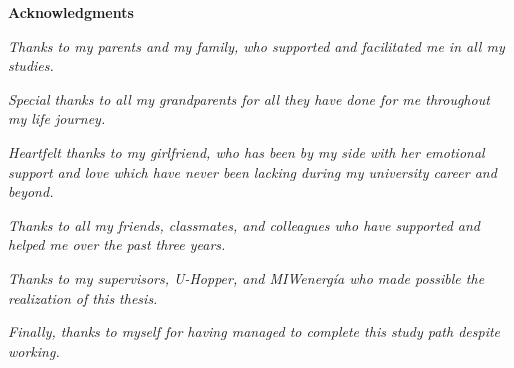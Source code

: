 \thispagestyle{empty}

\begin{center}
  {\bf \Huge Acknowledgments}
\end{center}

\vspace{4cm}

\noindent
\emph{Thanks to my parents and my family, who supported and facilitated me in all my studies.}

\noindent
\emph{Special thanks to all my grandparents for all they have done for me throughout my life journey.}

\vspace{\baselineskip}

\noindent
\emph{Heartfelt thanks to my girlfriend, who has been by my side with her emotional support and love which have never been lacking during my university career and beyond.}

\vspace{\baselineskip}

\noindent
\emph{Thanks to all my friends, classmates, and colleagues who have supported and helped me over the past three years.}

\vspace{\baselineskip}

\noindent
\emph{Thanks to my supervisors, U-Hopper, and MIWenergía who made possible the realization of this thesis.}

\vspace{\baselineskip}

\noindent
\emph{Finally, thanks to myself for having managed to complete this study path despite working.}
